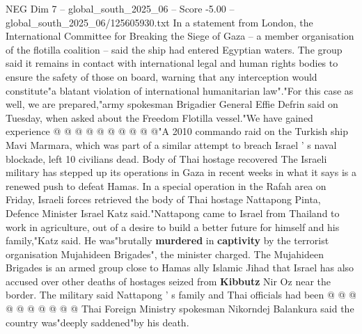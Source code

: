 \begin{textsample}{NEG Dim 7 – global\_south\_2025\_06 – Score -5.00 – global\_south\_2025\_06/125605930.txt}
In a statement from London, the International Committee for Breaking the Siege of Gaza -- a member organisation of the flotilla coalition -- said the ship had entered Egyptian waters.
The group said it remains in contact with international legal and human rights bodies to ensure the safety of those on board, warning that any interception would constitute"a blatant violation of international humanitarian law"."For this case as well, we are prepared,"army spokesman Brigadier General Effie Defrin said on Tuesday, when asked about the Freedom Flotilla vessel."We have gained experience @ @ @ @ @ @ @ @ @ @"A 2010 commando raid on the Turkish ship Mavi Marmara, which was part of a similar attempt to breach Israel ' s naval blockade, left 10 civilians dead.
Body of Thai hostage recovered The Israeli military has stepped up its operations in Gaza in recent weeks in what it says is a renewed push to defeat Hamas.
In a special operation in the Rafah area on Friday, Israeli forces retrieved the body of Thai hostage Nattapong Pinta, Defence Minister Israel Katz said."Nattapong came to Israel from Thailand to work in agriculture, out of a desire to build a better future for himself and his family,"Katz said.
He was"brutally \textbf{murdered} in \textbf{captivity} by the terrorist organisation Mujahideen Brigades", the minister charged.
The Mujahideen Brigades is an armed group close to Hamas ally Islamic Jihad that Israel has also accused over other deaths of hostages seized from \textbf{Kibbutz} Nir Oz near the border.
The military said Nattapong ' s family and Thai officials had been @ @ @ @ @ @ @ @ @ @ Thai Foreign Ministry spokesman Nikorndej Balankura said the country was"deeply saddened"by his death.

\end{textsample}
